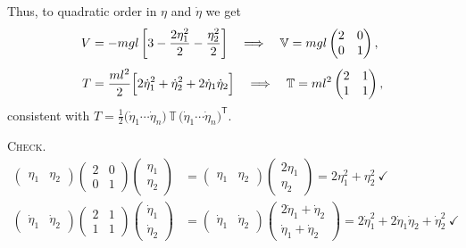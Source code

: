 \documentclass[11pt]{article}
\newcommand{\Vm}{\mathbb{V}}
\newcommand{\Tm}{\mathbb{T}}
\begin{document}
Thus, to quadratic order in $\eta$ and $\dot\eta$ we get
\begin{align*}
  V &= -mgl\left[3 - \frac{2\eta_1^2}{2} - \frac{\eta_2^2}{2}\right]
   \quad\Longrightarrow\quad
   \Vm = mgl\begin{pmatrix}2 & 0\\ 0 & 1\end{pmatrix},\\[4pt]
  T &= \frac{ml^2}{2}\Bigl[2\dot\eta_1^2 + \dot\eta_2^2 + 2\dot\eta_1\dot\eta_2\Bigr]
   \quad\Longrightarrow\quad
   \Tm = ml^2\begin{pmatrix}2 & 1\\ 1 & 1\end{pmatrix},
\end{align*}
consistent with
$T = \tfrac{1}{2}\bigl(\dot\eta_1 \cdots \dot\eta_n\bigr)\,\Tm\,
     \bigl(\dot\eta_1 \cdots \dot\eta_n\bigr)^{\mathsf T}$.

\medskip
\noindent\textsc{Check.}
\begin{align*}
  \begin{pmatrix}\eta_1 & \eta_2\end{pmatrix}
  \begin{pmatrix}2 & 0\\ 0 & 1\end{pmatrix}
  \begin{pmatrix}\eta_1\\ \eta_2\end{pmatrix}
  &= \begin{pmatrix}\eta_1 & \eta_2\end{pmatrix}
     \begin{pmatrix}2\eta_1\\ \eta_2\end{pmatrix}
   = 2\eta_1^2 + \eta_2^2 \ \checkmark\\
  \begin{pmatrix}\dot\eta_1 & \dot\eta_2\end{pmatrix}
  \begin{pmatrix}2 & 1\\ 1 & 1\end{pmatrix}
  \begin{pmatrix}\dot\eta_1\\ \dot\eta_2\end{pmatrix}
  &= \begin{pmatrix}\dot\eta_1 & \dot\eta_2\end{pmatrix}
     \begin{pmatrix}2\dot\eta_1 + \dot\eta_2\\ \dot\eta_1 + \dot\eta_2\end{pmatrix}
   = 2\dot\eta_1^2 + 2\dot\eta_1\dot\eta_2 + \dot\eta_2^2 \ \checkmark
\end{align*}
\end{document}
